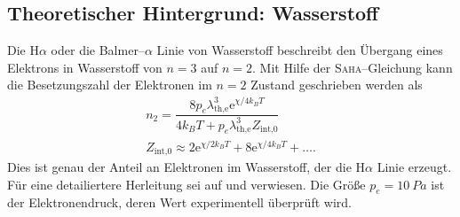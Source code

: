 \subsection{Theoretischer Hintergrund: Wasserstoff}
Die H$\alpha $ oder die Balmer--$\alpha $ Linie von Wasserstoff beschreibt den Übergang eines Elektrons in Wasserstoff von $n=3$ auf $n=2$.
Mit Hilfe der \textsc{Saha}--Gleichung kann die Besetzungszahl der Elektronen im $n=2$ Zustand geschrieben werden als
\begin{align} 
  n_2=\dfrac{8p_e\lambda _{\text{th,e}}^3\text{e}^{\chi /4k_BT}}{4k_BT+p_e\lambda _{\text{th,e}}^3Z_{\text{int,0}}} \label{eq:n2}\\
  Z_{\text{int,0}}\approx 2\text{e}^{\chi /2k_BT}+8\text{e}^{\chi /4k_BT}+\hdots 
.\end{align} 
Dies ist genau der Anteil an Elektronen im Wasserstoff, der die H$\alpha $ Linie erzeugt.
Für eine detailiertere Herleitung sei auf \cite{anleitung464} und \cite{saha} verwiesen.
Die Größe $p_e=\SI{10}{Pa}$ ist der Elektronendruck, deren Wert experimentell überprüft wird.
